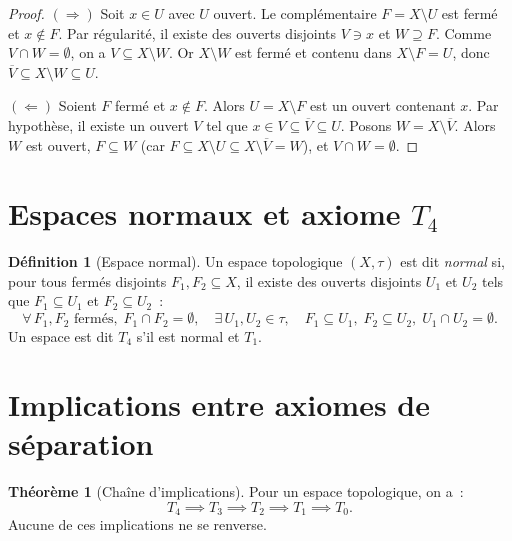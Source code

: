 \documentclass[12pt,a4paper,openany]{book}
\theoremstyle{definition}
\newtheorem{definition}{Définition}[chapter]
\theoremstyle{cours}
\newtheorem{theoreme}{Théorème}[chapter]
\theoremstyle{coursnormal}
\begin{document}
\begin{proof}
  $(\Rightarrow)$ Soit $x\in U$ avec $U$ ouvert. Le complémentaire
  $F=X\setminus U$ est fermé et $x\notin F$. Par régularité, il existe des
  ouverts disjoints $V\ni x$ et $W\supseteq F$. Comme $V\cap W=\emptyset$,
  on a $V\subseteq X\setminus W$. Or $X\setminus W$ est fermé et contenu dans
  $X\setminus F=U$, donc $\overline{V}\subseteq X\setminus W\subseteq U$.

  \medskip
  $(\Leftarrow)$ Soient $F$ fermé et $x\notin F$. Alors $U=X\setminus F$ est
  un ouvert contenant $x$. Par hypothèse, il existe un ouvert $V$ tel que
  $x\in V\subseteq\overline{V}\subseteq U$. Posons $W=X\setminus\overline{V}$.
  Alors $W$ est ouvert, $F\subseteq W$ (car $F\subseteq X\setminus U\subseteq
  X\setminus\overline{V}=W$), et $V\cap W=\emptyset$.
\end{proof}

\section{Espaces normaux et axiome $T_4$}\label{sec:T4}

\begin{definition}[Espace normal]\label{def:normal}
  Un espace topologique
  $(X,\tau)$ est dit \emph{normal} si, pour tous fermés disjoints $F_1,F_2
  \subseteq X$, il existe des ouverts disjoints $U_1$ et $U_2$ tels que
  $F_1\subseteq U_1$ et $F_2\subseteq U_2$~:
  \[
    \forall\, F_1,F_2 \text{ fermés},\; F_1\cap F_2=\emptyset,\quad
    \exists\, U_1,U_2\in\tau,\quad
    F_1\subseteq U_1,\; F_2\subseteq U_2,\; U_1\cap U_2=\emptyset.
  \]
  Un espace est dit \emph{$T_4$} s'il est normal et $T_1$.
\end{definition}

\section{Implications entre axiomes de séparation}\label{sec:implications}

\begin{theoreme}[Chaîne d'implications]\label{thm:chaine-implications}
  Pour un espace topologique, on a~:
  \[
    T_4 \implies T_3 \implies T_2 \implies T_1 \implies T_0.
  \]
  Aucune de ces implications ne se renverse.
\end{theoreme}
\end{document}
